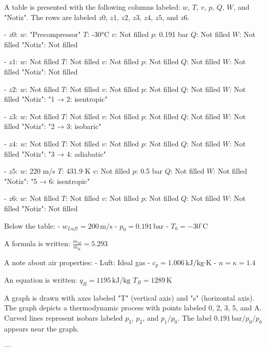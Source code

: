 A table is presented with the following columns labeled: \( w \), \( T \), \( v \), \( p \), \( Q \), \( W \), and "Notiz". The rows are labeled \( z0 \), \( z1 \), \( z2 \), \( z3 \), \( z4 \), \( z5 \), and \( z6 \).  

- \( z0 \):  
  \( w \): "Precompressor"  
  \( T \): -30°C  
  \( v \): Not filled  
  \( p \): 0.191 bar  
  \( Q \): Not filled  
  \( W \): Not filled  
  "Notiz": Not filled  

- \( z1 \):  
  \( w \): Not filled  
  \( T \): Not filled  
  \( v \): Not filled  
  \( p \): Not filled  
  \( Q \): Not filled  
  \( W \): Not filled  
  "Notiz": Not filled  

- \( z2 \):  
  \( w \): Not filled  
  \( T \): Not filled  
  \( v \): Not filled  
  \( p \): Not filled  
  \( Q \): Not filled  
  \( W \): Not filled  
  "Notiz": "1 → 2: isentropic"  

- \( z3 \):  
  \( w \): Not filled  
  \( T \): Not filled  
  \( v \): Not filled  
  \( p \): Not filled  
  \( Q \): Not filled  
  \( W \): Not filled  
  "Notiz": "2 → 3: isobaric"  

- \( z4 \):  
  \( w \): Not filled  
  \( T \): Not filled  
  \( v \): Not filled  
  \( p \): Not filled  
  \( Q \): Not filled  
  \( W \): Not filled  
  "Notiz": "3 → 4: adiabatic"  

- \( z5 \):  
  \( w \): 220 m/s  
  \( T \): 431.9 K  
  \( v \): Not filled  
  \( p \): 0.5 bar  
  \( Q \): Not filled  
  \( W \): Not filled  
  "Notiz": "5 → 6: isentropic"  

- \( z6 \):  
  \( w \): Not filled  
  \( T \): Not filled  
  \( v \): Not filled  
  \( p \): Not filled  
  \( Q \): Not filled  
  \( W \): Not filled  
  "Notiz": Not filled  

Below the table:  
- \( w_{Luft} = 200 \, \text{m/s} \)  
- \( p_0 = 0.191 \, \text{bar} \)  
- \( T_0 = -30^\circ \text{C} \)  

A formula is written:  
\( \frac{\dot{m}_M}{\dot{m}_K} = 5.293 \)  

A note about air properties:  
- Luft: Ideal gas  
- \( c_p = 1.006 \, \text{kJ/kg·K} \)  
- \( n = \kappa = 1.4 \)  

An equation is written:  
\( q_B = 1195 \, \text{kJ/kg} \)  
\( T_B = 1289 \, \text{K} \)

A graph is drawn with axes labeled "T" (vertical axis) and "s" (horizontal axis). The graph depicts a thermodynamic process with points labeled 0, 2, 3, 5, and A. Curved lines represent isobars labeled \( p_3 \), \( p_2 \), and \( p_1/p_0 \). The label \( 0.191 \, \text{bar}/p_0/p_0 \) appears near the graph.

---